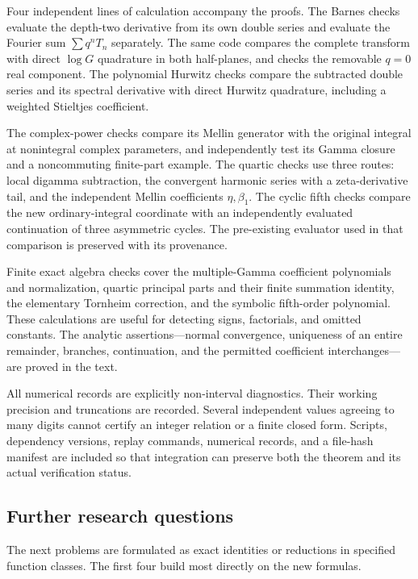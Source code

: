 \documentclass[11pt]{article}
\numberwithin{equation}{section}
\theoremstyle{plain}
\theoremstyle{definition}
\theoremstyle{remark}
\begin{document}
Four independent lines of calculation accompany the proofs.
The Barnes checks evaluate the depth-two derivative from its own
double series and evaluate the Fourier sum $\sum q^nT_n$ separately.
The same code compares the complete transform with direct
$\log G$ quadrature in both half-planes, and checks the removable
$q=0$ real component. The polynomial Hurwitz checks compare the
subtracted double series and its spectral derivative with direct
Hurwitz quadrature, including a weighted Stieltjes coefficient.

The complex-power checks compare its Mellin generator with the
original integral at nonintegral complex parameters, and independently
test its Gamma closure and a noncommuting finite-part example.
The quartic checks use three routes: local digamma subtraction,
the convergent harmonic series with a zeta-derivative tail, and
the independent Mellin coefficients $\eta,\beta_1$.
The cyclic fifth checks compare the new ordinary-integral coordinate
with an independently evaluated continuation of three asymmetric
cycles. The pre-existing evaluator used in that comparison is
preserved with its provenance.

Finite exact algebra checks cover the multiple-Gamma coefficient
polynomials and normalization, quartic principal parts and their
finite summation identity, the elementary Tornheim correction,
and the symbolic fifth-order polynomial. These calculations are
useful for detecting signs, factorials, and omitted constants.
The analytic assertions---normal convergence, uniqueness of an
entire remainder, branches, continuation, and the permitted
coefficient interchanges---are proved in the text.

All numerical records are explicitly non-interval diagnostics.
Their working precision and truncations are recorded. Several
independent values agreeing to many digits cannot certify an
integer relation or a finite closed form. Scripts, dependency
versions, replay commands, numerical records, and a file-hash
manifest are included so that integration can preserve both the
theorem and its actual verification status.

\subsection{Further research questions}

The next problems are formulated as exact identities or reductions
in specified function classes. The first four build most directly
on the new formulas.
\end{document}
